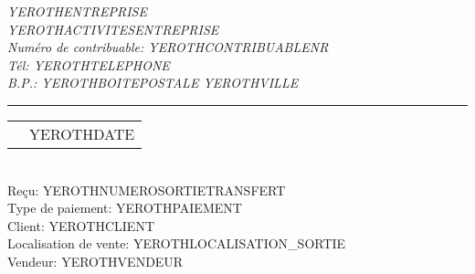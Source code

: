 \documentclass[1.75pt]{article} %
\makeatletter
\newcommand{\headerrow}[2]
{\begin{tabular*}{\linewidth}{l@{\extracolsep{\fill}}r}
	#1 &
	#2 \\
\end{tabular*}}
\makeatother
\begin{document}
\emph{YEROTHENTREPRISE} \\
\emph{YEROTHACTIVITESENTREPRISE} \\
\emph{Num\'ero de contribuable: YEROTHCONTRIBUABLENR} \\
\emph{T\'el: YEROTHTELEPHONE} \\
\emph{B.P.: YEROTHBOITEPOSTALE YEROTHVILLE}

\vspace*{0.2cm}

\hrule

\headerrow
{}
{YEROTHDATE}\\

Re\c{c}u: YEROTHNUMEROSORTIETRANSFERT\\
Type de paiement: YEROTHPAIEMENT\\
Client: YEROTHCLIENT\\
Localisation de vente: YEROTHLOCALISATION_SORTIE\\
Vendeur: YEROTHVENDEUR
\vspace*{0.2cm}

\end{document}
